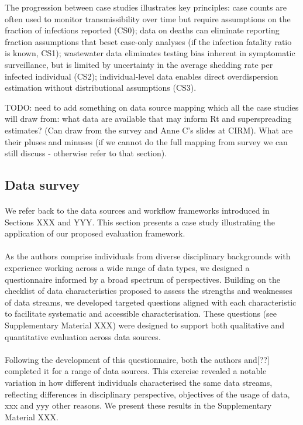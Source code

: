 \documentclass{article}
\begin{document}
The progression between case studies illustrates key principles: case counts are often used to monitor transmissibility over time but require assumptions on the fraction of infections reported (CS0); data on deaths can eliminate reporting fraction assumptions that beset case-only analyses (if the infection fatality ratio is known, CS1); wastewater data eliminates testing bias inherent in symptomatic surveillance, but is limited by uncertainty in the average shedding rate per infected individual (CS2); individual-level data enables direct overdispersion estimation without distributional assumptions (CS3).


TODO: need to add something on data source mapping which all the case studies will draw from: what data are available that may inform Rt and superspreading estimates? (Can draw from the survey and Anne C's slides at CIRM). What are their pluses and minuses (if we cannot do the full mapping from survey we can still discuss - otherwise refer to that section).

\subsection{Data survey}

\paragraph{}We refer back to the data sources and workflow frameworks introduced in Sections XXX and YYY. This section presents a case study illustrating the application of our proposed evaluation framework. 

\paragraph{}As the authors comprise individuals from diverse disciplinary backgrounds with experience working across a wide range of data types, we designed a questionnaire informed by a broad spectrum of perspectives. Building on the checklist of data characteristics proposed to assess the strengths and weaknesses of data streams, we developed targeted questions aligned with each characteristic to facilitate systematic and accessible characterisation. These questions (see Supplementary Material XXX) were designed to support both qualitative and quantitative evaluation across data sources. 

\paragraph{}Following the development of this questionnaire, both the authors and[??] completed it for a range of data sources. This exercise revealed a notable variation in how different individuals characterised the same data streams, reflecting differences in disciplinary perspective, objectives of the usage of data, xxx and yyy other reasons. We present these results in the Supplementary Material XXX. 
\end{document}

